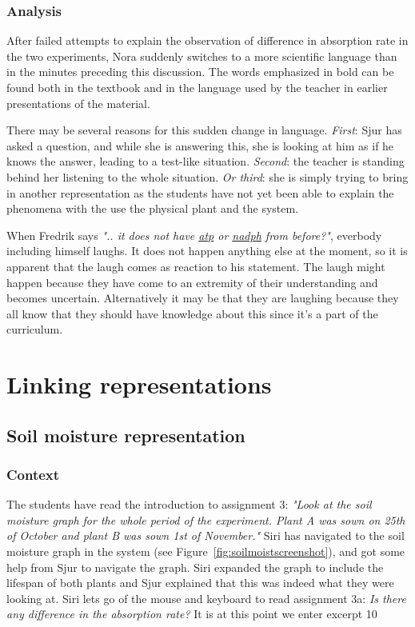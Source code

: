 \subsubsection*{Analysis}
After failed attempts to explain the observation of difference in absorption rate in the two experiments, Nora suddenly switches to a more scientific language than in the minutes preceding this discussion. The words emphasized in bold can be found both in the textbook and in the language used by the teacher in earlier presentations of the material.

There may be several reasons for this sudden change in language. \emph{First}: Sjur has asked a question, and while she is answering this, she is looking at him as if he knows the answer, leading to a test-like situation. \emph{Second}: the teacher is standing behind her listening to the whole situation. \emph{Or third}: she is simply trying to bring in another representation as the students have not yet been able to explain the phenomena with the use the physical plant and the system. 

When Fredrik says \emph{".. it does not have \underline{atp} or \underline{nadph} from before?"}, everbody including himself laughs. It does not happen anything else at the moment, so it is apparent that the laugh comes as reaction to his statement. The laugh might happen because they have come to an extremity of their understanding and becomes uncertain. Alternatively it may be that they are laughing because they all know that they should have knowledge about this since it's a part of the curriculum.


\section{Linking representations}
\label{cha:linking}
\subsection{Soil moisture representation}


\subsubsection*{Context}
The students have read the introduction to assignment 3: \emph{"Look at the soil moisture graph for the whole period of the experiment. Plant A was sown on 25th of October and plant B was sown 1st of November."} Siri has navigated to the soil moisture graph in the system (see Figure~\ref{fig:soilmoistscreenshot}), and got some help from Sjur to navigate the graph. Siri expanded the graph to include the lifespan of both plants and Sjur explained that this was indeed what they were looking at. Siri lets go of the mouse and keyboard to read assignment 3a: \emph{Is there any difference in the absorption rate?} It is at this point we enter excerpt 10



